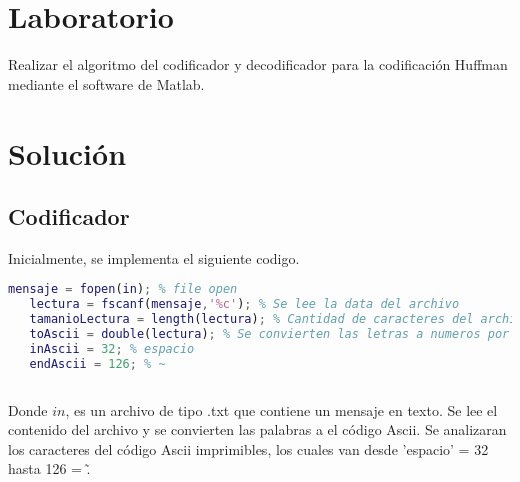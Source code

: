 \maketitle

\section{Laboratorio}
Realizar el algoritmo del codificador y decodificador para la codificación Huffman mediante el software de Matlab.

\section{Solución}
\subsection{Codificador}


Inicialmente, se implementa el siguiente codigo.

\begin{lstlisting}[language=Matlab,breaklines = true,frame      = false]
   mensaje = fopen(in); % file open
   lectura = fscanf(mensaje,'%c'); % Se lee la data del archivo
   tamanioLectura = length(lectura); % Cantidad de caracteres del archivo
   toAscii = double(lectura); % Se convierten las letras a numeros por ascii
   inAscii = 32; % espacio
   endAscii = 126; % ~
   
\end{lstlisting}

Donde $in$, es un archivo de tipo .txt que contiene un mensaje en texto. Se lee el contenido del archivo y se convierten las palabras a el código Ascii. Se analizaran los caracteres del código Ascii imprimibles, los cuales van desde 'espacio' = 32 hasta 126 = \~  .

